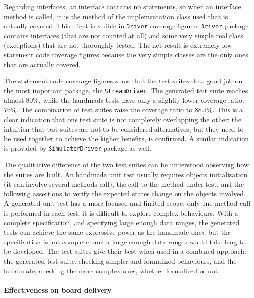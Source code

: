 \documentclass[english]{lni}
\newcommand{\lil}[1]{\texttt{\lstinline|#1|}}
\begin{document}
Regarding interfaces, an interface contains no statements, so when an interface method is called, it is the method of the implementation class used that is actually covered.
This effect is visible in \lil{Driver} coverage figures: \lil{Driver} package contains interfaces (that are not counted at all) and some very simple real class (exceptions) that are not thoroughly tested. 
The net result is extremely low statement code coverage figures because the very simple classes are the only ones that are actually covered. 

The statement code coverage figures show that the test suites do a good job on the most important package, the \lil{StreamDriver}. 
The generated test suite reaches almost $ 80 \% $, while the handmade tests have only a slightly lower coverage ratio: $ 76 \% $. 
The combination of test suites raise the coverage ratio to $ 88.5 \% $. 
This is a clear indication that one test suite is not completely overlapping the other: the intuition that test suites are not to be considered alternatives, but they need to be used together to achieve the higher benefits, is confirmed.
A similar indication is provided by \lil{SimulatorDriver} package as well.

The qualitative difference of the two test suites can be understood observing how the suites are built. 
An handmade unit test usually requires objects initialization (it can involve several methods call), the call to the method under test, and the following assertions to verify the expected states change on the objects involved. 
A generated unit test has a more focused and limited scope: only one method call is performed in each test, it is difficult to explore complex behaviours. 
With a complete specification, and specifying large enough data ranges, the generated tests can achieve the same expressive power as the handmade ones; but the specification is not complete, and a large enough data ranges would take long to be developed.
The test suites give their best when used in a combined approach: the generated test suite, checking simpler and formalized behaviours, and the handmade, checking the more complex ones, whether formalized or not.  



\paragraph*{Effectiveness on board delivery}
\end{document}
